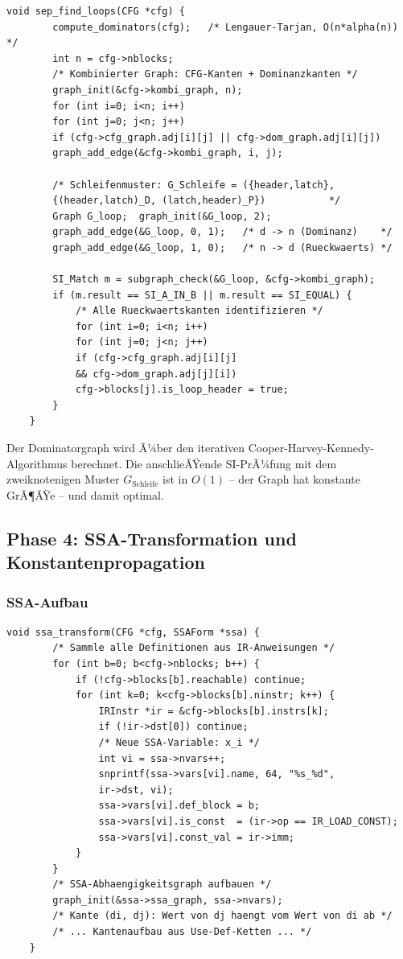 ﻿\documentclass[a4paper,12pt]{article}
\theoremstyle{definition}
\begin{document}
\begin{lstlisting}[style=cstyle, caption={SEP -- kombinierter Graph und
		Schleifenmuster (compiler\_full.c)}, label=lst:sep-impl]
	void sep_find_loops(CFG *cfg) {
		compute_dominators(cfg);   /* Lengauer-Tarjan, O(n*alpha(n)) */
		int n = cfg->nblocks;
		/* Kombinierter Graph: CFG-Kanten + Dominanzkanten */
		graph_init(&cfg->kombi_graph, n);
		for (int i=0; i<n; i++)
		for (int j=0; j<n; j++)
		if (cfg->cfg_graph.adj[i][j] || cfg->dom_graph.adj[i][j])
		graph_add_edge(&cfg->kombi_graph, i, j);
		
		/* Schleifenmuster: G_Schleife = ({header,latch},
		{(header,latch)_D, (latch,header)_P})           */
		Graph G_loop;  graph_init(&G_loop, 2);
		graph_add_edge(&G_loop, 0, 1);   /* d -> n (Dominanz)    */
		graph_add_edge(&G_loop, 1, 0);   /* n -> d (Rueckwaerts) */
		
		SI_Match m = subgraph_check(&G_loop, &cfg->kombi_graph);
		if (m.result == SI_A_IN_B || m.result == SI_EQUAL) {
			/* Alle Rueckwaertskanten identifizieren */
			for (int i=0; i<n; i++)
			for (int j=0; j<n; j++)
			if (cfg->cfg_graph.adj[i][j]
			&& cfg->dom_graph.adj[j][i])
			cfg->blocks[j].is_loop_header = true;
		}
	}
\end{lstlisting}

Der Dominatorgraph wird Ã¼ber den iterativen Cooper-Harvey-Kennedy-Algorithmus
berechnet. Die anschlieÃŸende SI-PrÃ¼fung mit dem
zweiknoten\-igen Muster $G_{\text{Schleife}}$ ist in $O(1)$ -- der Graph hat
konstante GrÃ¶ÃŸe -- und damit optimal.

\subsection{Phase 4: SSA-Transformation und Konstantenpropagation}
\label{sec:impl-cpp}

\subsubsection{SSA-Aufbau}

\begin{lstlisting}[style=cstyle, caption={SSA-AbhÃ¤ngigkeitsgraph
		(compiler\_full.c)}, label=lst:ssa-impl]
	void ssa_transform(CFG *cfg, SSAForm *ssa) {
		/* Sammle alle Definitionen aus IR-Anweisungen */
		for (int b=0; b<cfg->nblocks; b++) {
			if (!cfg->blocks[b].reachable) continue;
			for (int k=0; k<cfg->blocks[b].ninstr; k++) {
				IRInstr *ir = &cfg->blocks[b].instrs[k];
				if (!ir->dst[0]) continue;
				/* Neue SSA-Variable: x_i */
				int vi = ssa->nvars++;
				snprintf(ssa->vars[vi].name, 64, "%s_%d",
				ir->dst, vi);
				ssa->vars[vi].def_block = b;
				ssa->vars[vi].is_const  = (ir->op == IR_LOAD_CONST);
				ssa->vars[vi].const_val = ir->imm;
			}
		}
		/* SSA-Abhaengigkeitsgraph aufbauen */
		graph_init(&ssa->ssa_graph, ssa->nvars);
		/* Kante (di, dj): Wert von dj haengt vom Wert von di ab */
		/* ... Kantenaufbau aus Use-Def-Ketten ... */
	}
\end{lstlisting}
\end{document}
